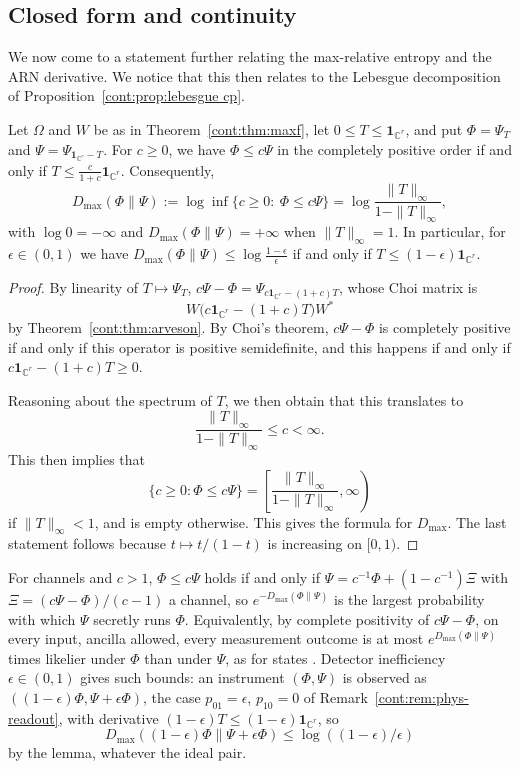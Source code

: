 \subsection{Closed form and continuity}

We now come to a statement further relating the max-relative entropy and the ARN derivative. We notice that this then relates to the Lebesgue decomposition of Proposition~\ref{cont:prop:lebesgue cp}. 
\begin{lemma}\label{cont:lem:dmax}
Let $\Omega$ and $W$ be as in Theorem~\ref{cont:thm:maxf}, let $0\leq T\leq\mathbf{1}_{\mathbb{C}^r}$, and put $\Phi=\Psi_T$ and $\Psi=\Psi_{\mathbf{1}_{\mathbb{C}^r}-T}$. For $c\geq0$, we have $\Phi\leq c\Psi$ in the completely positive order if and only if $T\leq\frac{c}{1+c}\mathbf{1}_{\mathbb{C}^r}$. Consequently,
\[
D_{\max}(\Phi\|\Psi):=\log\inf\{c\geq0:\ \Phi\leq c\Psi\}=\log\frac{\|T\|_\infty}{1-\|T\|_\infty},
\]
with $\log0=-\infty$ and $D_{\max}(\Phi\|\Psi)=+\infty$ when $\|T\|_\infty=1$. In particular, for $\epsilon\in(0,1)$ we have $D_{\max}(\Phi\|\Psi)\leq\log\frac{1-\epsilon}{\epsilon}$ if and only if $T\leq(1-\epsilon)\mathbf{1}_{\mathbb{C}^r}$.
\end{lemma}

\begin{proof}
By linearity of $T\mapsto\Psi_T$, $c\Psi-\Phi=\Psi_{c\mathbf{1}_{\mathbb{C}^r}-(1+c)T}$, whose Choi matrix is \[W\big(c\mathbf{1}_{\mathbb{C}^r}-(1+c)T\big)W^*\] by Theorem~\ref{cont:thm:arveson}. By Choi's theorem, $c\Psi-\Phi$ is completely positive if and only if this operator is positive semidefinite, and this happens if and only if $c\mathbf{1}_{\mathbb{C}^r}-(1+c)T\geq0$.

Reasoning about the spectrum of $T$, we then obtain that this translates to 
\[
    \frac{\|T\|_\infty}{1-\|T\|_\infty}\leq c< \infty.
\]
This then implies that \[\{ c\geq 0:\Phi\leq c\Psi\}=\left[\frac{\|T\|_\infty}{1-\|T\|_\infty},\infty\right)\]
if $\|T\|_\infty<1$, and is empty otherwise. This gives the formula for $D_{\max}$. The last statement follows because $t\mapsto t/(1-t)$ is increasing on $[0,1)$.
\end{proof}
\begin{remark}\label{cont:rem:phys-dmax}
For channels and $c>1$, $\Phi\leq c\Psi$ holds if and only if $\Psi=c^{-1}\Phi+(1-c^{-1})\Xi$ with $\Xi=(c\Psi-\Phi)/(c-1)$ a channel, so $e^{-D_{\max}(\Phi\|\Psi)}$ is the largest probability with which $\Psi$ secretly runs $\Phi$. Equivalently, by complete positivity of $c\Psi-\Phi$, on every input, ancilla allowed, every measurement outcome is at most $e^{D_{\max}(\Phi\|\Psi)}$ times likelier under $\Phi$ than under $\Psi$, as for states \cite{ReebKastoryanoWolf2011}. Detector inefficiency $\epsilon\in(0,1)$ gives such bounds: an instrument $(\Phi,\Psi)$ is observed as $((1-\epsilon)\Phi,\Psi+\epsilon\Phi)$, the case $p_{01}=\epsilon$, $p_{10}=0$ of Remark~\ref{cont:rem:phys-readout}, with derivative $(1-\epsilon)T\leq(1-\epsilon)\mathbf{1}_{\mathbb{C}^r}$, so
\[
D_{\max}((1-\epsilon)\Phi\|\Psi+\epsilon\Phi)\leq\log((1-\epsilon)/\epsilon)
\]
by the lemma, whatever the ideal pair.
\end{remark}

